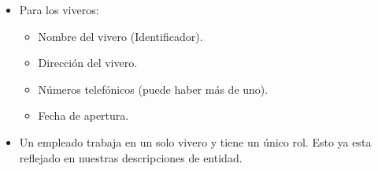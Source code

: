 \documentclass[12pt,a4paper]{article}
\begin{document}
\begin{itemize}
	\item Para los viveros:\\
		\begin{itemize}
			\item Nombre del vivero (Identificador).\\
			\item Dirección del vivero.\\
			\item Números telefónicos (puede haber más de uno).\\
			\item Fecha de apertura.\\
		\end{itemize}

	\item Un empleado trabaja en un solo vivero y tiene un único rol.
		Esto ya esta reflejado en nuestras descripciones de entidad.\\
\end{itemize}
\end{document}
